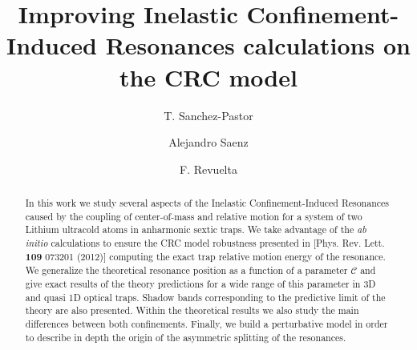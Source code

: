 \documentclass[aps,pre,twocolumn,superscriptaddress,showpacs]{revtex4-1}
\newcommand{\abinitio}{\textit{ab initio }}
\begin{document}
\title{Improving Inelastic Confinement-Induced Resonances calculations on the CRC model}
%
\author{T. Sanchez-Pastor}

\author{Alejandro Saenz}

\author{F. Revuelta}
%
\begin{abstract}
In this work we study several aspects of the Inelastic Confinement-Induced Resonances caused by the coupling of center-of-mass and relative motion for a system of two Lithium ultracold atoms in anharmonic sextic traps. We take advantage of the \abinitio calculations to ensure the CRC model robustness presented in [Phys. Rev. Lett. \textbf{109} 073201 (2012)] computing the exact trap relative motion energy of the resonance. We generalize the theoretical resonance position as a function of a parameter $\mathcal{C}$ and give exact results of the theory predictions for a wide range of this parameter in 3D and quasi 1D optical traps. Shadow bands corresponding to the predictive limit of the theory are also presented. Within the theoretical results we also study the main differences between both confinements. Finally, we build a perturbative model in order to describe in depth the origin of the asymmetric splitting of the resonances.
\end{abstract}

\maketitle

\end{document}
